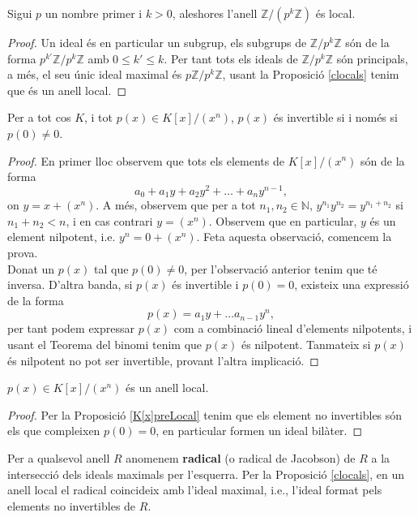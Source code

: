 \begin{prop}\label{Zp}
Sigui $p$ un nombre primer i $k>0$, aleshores l'anell $\mathbb{Z}/(p^k \mathbb{Z})$ és local.
\end{prop}
\begin{proof}
Un ideal és en particular un subgrup, els subgrups de $\mathbb{Z}/p^k\mathbb{Z}$ són de la forma $p^{k'}\mathbb{Z}/p^k\mathbb{Z}$ amb $0\leq k' \leq k$. Per tant tots els ideals de $\mathbb{Z}/p^k\mathbb{Z}$ són principals, a més, el seu únic ideal maximal és $p\mathbb{Z}/p^k \mathbb{Z}$, usant la Proposició \ref{clocals} tenim que és un anell local.
\end{proof}

\begin{prop} \label{K[x]preLocal}
Per a tot cos $K$, i tot $p(x)\in K[x]/(x^n)$, $p(x)$ és invertible si i només si $p(0)\neq 0$. 
\end{prop}
\begin{proof}
En primer lloc observem que tots els elements de $ K[x]/(x^n)$ són de la forma
$$
a_0+a_1y+a_2y^2+\dots + a_n y^{n-1},
$$
on $y=x + (x^n)$. A més, observem que per a tot $n_1,n_2\in \mathbb{N}$, $y^{n_1}y^{n_2}=y^{n_1+n_2}$ si $n_1+n_2<n$, i en cas contrari $y=(x^n)$. Observem que en particular, $y$ és un element nilpotent, i.e. $y^n=0+(x^n)$. Feta aquesta observació, comencem la prova.
\\
Donat un $p(x)$ tal que $p(0)\neq 0$, per l'observació anterior tenim que té inversa. D'altra banda, si $p(x)$ és invertible i $p(0)=0$, existeix una expressió de la forma $$p(x)=a_1y+\dots a_{n-1}y^n,$$ per tant podem expressar $p(x)$ com a combinació lineal d'elements nilpotents, i usant el Teorema del binomi tenim que $p(x)$ és nilpotent. Tanmateix si $p(x)$ és nilpotent no pot ser invertible, provant l'altra implicació.
\end{proof}

\begin{cor} \label{K[x]local} $p(x)\in K[x]/(x^n)$ és un anell local.
\end{cor}
\begin{proof}
Per la Proposició \ref{K[x]preLocal} tenim que els element no invertibles són els que compleixen $p(0)=0$, en particular formen un ideal bilàter.
\end{proof}

\begin{definition}
Per a qualsevol anell $R$ anomenem \textbf{radical} (o radical de Jacobson) de $R$ a la intersecció dels ideals maximals per l'esquerra. Per la Proposició \ref{clocals}, en un anell local el radical coincideix amb l'ideal maximal, i.e., l'ideal format pels elements no invertibles de $R$.
\end{definition}

